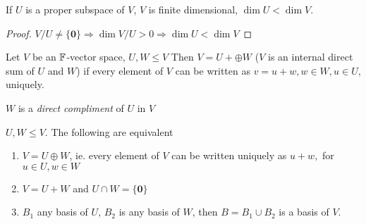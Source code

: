 \documentclass[a4paper]{article}
\begin{document}
\begin{cor} 
	If $ U $ is a proper subspace of $ V $, $ V $ is finite dimensional, $ \dim U < \dim V $.
	
	\begin{proof}
		$ V / U \neq \{ \mathbf{0} \} \Rightarrow \dim V/U  > 0 \Rightarrow \dim U < \dim V$
	\end{proof}
\end{cor}

\begin{defi}
	Let $ V $ be an $ \mathbb{F} $-vector space, $ U,W \leq V $
	Then $ V = U + \oplus W $ ($ V $ is an internal direct sum of $ U $ and $ W $) if every element of $ V $ can be written as $ v  = u + w, w \in W, u \in U $, uniquely.
	
	$ W $ is a \emph{direct compliment} of $ U $ in $ V $
\end{defi}

\begin{lemma} 
	$ U,W \leq V $. The following are equivalent
	
	\begin{enumerate}
		\item $ V = U \oplus W $, ie. every element of $ V $ can be written uniquely as $ u + w, $ for  $u \in U, w \in W $
		\item $ V = U + W $ and $ U \cap W = \{ \mathbf{0} \} $
		\item $ B_{1} $ any basis of $ U $, $ B_{2} $ is any basis of $ W $, then $ B = B_{1} \cup B_{2} $ is a basis of $ V $.
		
	\end{enumerate}
\end{lemma}
\end{document}
